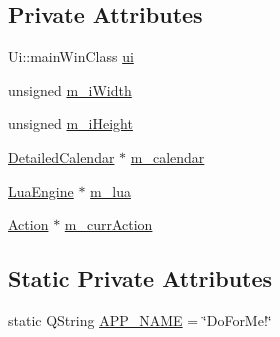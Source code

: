 \subsection*{Private Attributes}
\begin{DoxyCompactItemize}
\item 
Ui\-::main\-Win\-Class \hyperlink{classmain_win_a89fa9d3006573378f3195845fe9ed408}{ui}
\item 
unsigned \hyperlink{classmain_win_a698988f67b0f686dba0a8e33187f66a1}{m\-\_\-i\-Width}
\item 
unsigned \hyperlink{classmain_win_afaa8e85eaf3926a8aa141bfc1b2c0c01}{m\-\_\-i\-Height}
\item 
\hyperlink{class_detailed_calendar}{Detailed\-Calendar} $\ast$ \hyperlink{classmain_win_a6a02cf853e63c1ad31759f3ce225ed62}{m\-\_\-calendar}
\item 
\hyperlink{class_lua_engine}{Lua\-Engine} $\ast$ \hyperlink{classmain_win_a96b71dd9a31a4cf6ea5db224a4540458}{m\-\_\-lua}
\item 
\hyperlink{class_action}{Action} $\ast$ \hyperlink{classmain_win_ab66a39c8f78038b3cfaba29066c9fd4d}{m\-\_\-curr\-Action}
\end{DoxyCompactItemize}
\subsection*{Static Private Attributes}
\begin{DoxyCompactItemize}
\item 
static Q\-String \hyperlink{classmain_win_a334ae495c1fd5d2063ba42801725d5ea}{A\-P\-P\-\_\-\-N\-A\-M\-E} = \char`\"{}Do\-For\-Me!\char`\"{}
\end{DoxyCompactItemize}


